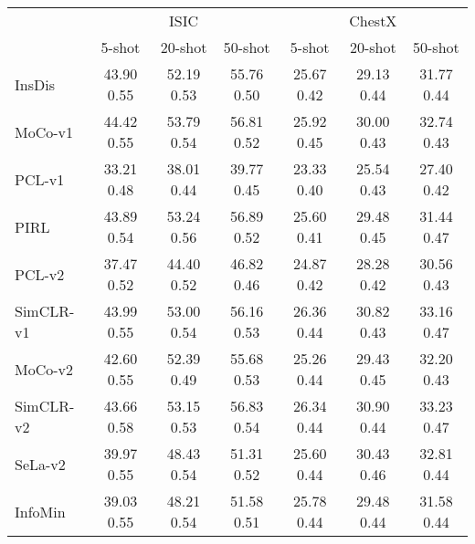 \documentclass[runningheads]{llncs}
\begin{document}
\begin{table}[t]
{    \begin{tabular}{lccc|ccc}
    \toprule
    {} & \multicolumn{3}{c}{ISIC} & \multicolumn{3}{c}{ChestX} \\
    {} &                        5-shot &                       20-shot &                       50-shot &                        5-shot &                       20-shot & 50-shot \\
    \midrule
    InsDis              &              43.90  0.55 &              52.19  0.53 &              55.76  0.50 &              25.67  0.42 &              29.13  0.44 &              31.77  0.44 \\
    MoCo-v1             &     44.42  0.55 &    53.79  0.54 &              56.81  0.52 &              25.92  0.45 &              30.00  0.43 &              32.74  0.43 \\
    PCL-v1              &              33.21  0.48 &              38.01  0.44 &              39.77  0.45 &              23.33  0.40 &              25.54  0.43 &              27.40  0.42 \\
    PIRL                &              43.89  0.54 &              53.24  0.56 &  56.89  0.52 &              25.60  0.41 &              29.48  0.45 &              31.44  0.47 \\
    PCL-v2              &              37.47  0.52 &              44.40  0.52 &              46.82  0.46 &              24.87  0.42 &              28.28  0.42 &              30.56  0.43 \\
    SimCLR-v1           & 43.99  0.55 &              53.00  0.54 &              56.16  0.53 &              26.36  0.44 &              30.82  0.43 &              33.16  0.47 \\
    MoCo-v2             &              42.60  0.55 &              52.39  0.49 &              55.68  0.53 &              25.26  0.44 &              29.43  0.45 &              32.20  0.43 \\
    SimCLR-v2           &               43.66  0.58 &              53.15  0.53 &              56.83  0.54 &              26.34  0.44 &              30.90  0.44 &              33.23  0.47 \\
    SeLa-v2             &              39.97  0.55 &              48.43  0.54 &              51.31  0.52 &              25.60  0.44 &              30.43  0.46 &              32.81  0.44 \\
    InfoMin             &              39.03  0.55 &              48.21  0.54 &              51.58  0.51 &              25.78  0.44 &              29.48  0.44 &              31.58  0.44 \\

\end{tabular}}
\end{table}
\end{document}
